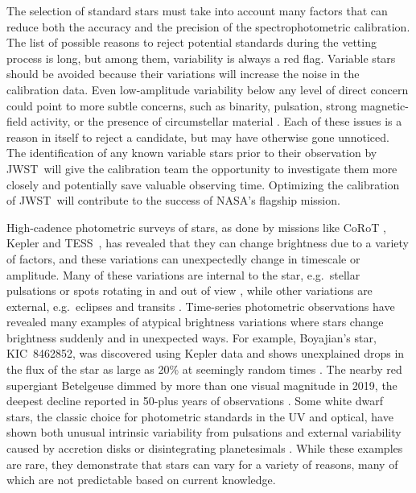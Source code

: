 \documentclass[twocolumn, linenumbers]{aastex631}
\newcommand{\webb}{JWST}
\newcommand{\tess}{TESS}
\begin{document}
The selection of standard stars must take into account many factors that can reduce both the accuracy and the precision of the spectrophotometric calibration.  The list of possible reasons to reject potential standards during the vetting process is long, but among them, variability is always a red flag.  Variable stars should be avoided because their variations will increase the noise in the calibration data.  Even low-amplitude variability below any level of direct concern could point to more subtle concerns, such as binarity, pulsation, strong magnetic-field activity, or the presence of circumstellar material \citep{Bohlin2014PASP126}. Each of these issues is a reason in itself to reject a candidate, but may have otherwise gone unnoticed.  The identification of any known variable stars prior to their observation by \webb\ will give the calibration team the opportunity to investigate them more closely and potentially save valuable observing time.  Optimizing the calibration of \webb\ will contribute to the success of NASA's flagship mission.

High-cadence photometric surveys of stars, as done by missions like CoRoT \citep{corot}, Kepler \citep{Koch2010} and \tess\ \citep{Ricker2015}, has revealed that they can change brightness due to a variety of factors, and these variations can unexpectedly change in timescale or amplitude. Many of these variations are internal to the star, e.g.\ stellar pulsations or spots rotating in and out of view \citep[e.g.][]{Berger1979deltaScuti, Mcquillan2014}, while other variations are external, e.g.\ eclipses and transits \citep[e.g.][]{prsa2011, Thompson2018}. Time-series photometric observations have revealed many examples of atypical brightness variations where stars change brightness suddenly and in unexpected ways.  For example, Boyajian's star, KIC~8462852, was discovered using Kepler data and shows unexplained drops in the flux of the star as large as 20\% at seemingly random times \citep{Boyajian2016MNRAS}.  The nearby red supergiant Betelgeuse dimmed by more than one visual magnitude in 2019, the deepest decline reported in 50-plus years of observations \citep{Betelgeuse2021Natur594,Cotton2020RNAAS4}.  Some white dwarf stars, the classic choice for photometric standards in the UV and optical, have shown both unusual intrinsic variability from pulsations \citep[e.g.][]{Provencal2009ApJGD358,Kilic2015ApJ,Hermes2017MNRAS} and external variability caused by accretion disks \citep{Scaringi2021Nat} or disintegrating planetesimals \citep[as large as 40\%;][]{Vanderburg2015Natur,Guidry2021}.  While these examples are rare, they demonstrate that stars can vary for a variety of reasons, many of which are not predictable based on current knowledge.  
\end{document}
